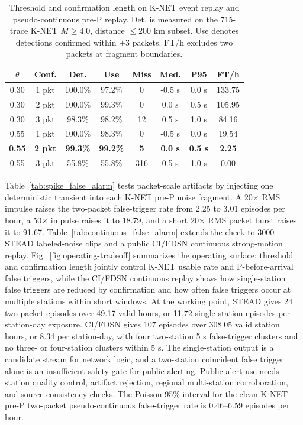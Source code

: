 \documentclass[journal]{IEEEtran}
\begin{document}
\begin{table}[!t]
\centering
\caption{Threshold and confirmation length on K-NET event replay and pseudo-continuous pre-P replay. Det. is measured on the 715-trace K-NET $M\geq4.0$, distance $\leq200$ km subset. Use denotes detections confirmed within $\pm$3 packets. FT/h excludes two packets at fragment boundaries.}
\label{tab:falsealarm}
{\scriptsize\setlength{\tabcolsep}{1.25pt}\renewcommand{\arraystretch}{1.03}
\begin{tabular}{@{}cccccccc@{}}
\toprule
$\theta$ & Conf. & Det. & Use & Miss & Med. & P95 & FT/h\\
\midrule
0.30 & 1 pkt & 100.0\% & 97.2\% & 0 & -0.5 s & 0.0 s & 133.75\\
0.30 & 2 pkt & 100.0\% & 99.3\% & 0 & 0.0 s & 0.5 s & 105.95\\
0.30 & 3 pkt & 98.3\% & 98.2\% & 12 & 0.5 s & 1.0 s & 84.16\\
0.55 & 1 pkt & 100.0\% & 98.3\% & 0 & -0.5 s & 0.0 s & 19.54\\
\textbf{0.55} & \textbf{2 pkt} & \textbf{99.3\%} & \textbf{99.2\%} & \textbf{5} & \textbf{0.0 s} & \textbf{0.5 s} & \textbf{2.25}\\
0.55 & 3 pkt & 55.8\% & 55.8\% & 316 & 0.5 s & 1.0 s & 0.00\\
\bottomrule
\end{tabular}}
\end{table}




Table~\ref{tab:spike_false_alarm} tests packet-scale artifacts by injecting one deterministic transient into each K-NET pre-P noise fragment. A 20$\times$ RMS impulse raises the two-packet false-trigger rate from 2.25 to 3.01 episodes per hour, a 50$\times$ impulse raises it to 18.79, and a short 20$\times$ RMS packet burst raises it to 91.67. Table~\ref{tab:continuous_false_alarm} extends the check to 3000 STEAD labeled-noise clips and a public CI/FDSN continuous strong-motion replay. Fig.~\ref{fig:operating-tradeoff} summarizes the operating surface: threshold and confirmation length jointly control K-NET usable rate and P-before-arrival false triggers, while the CI/FDSN continuous replay shows how single-station false triggers are reduced by confirmation and how often false triggers occur at multiple stations within short windows. At the working point, STEAD gives 24 two-packet episodes over 49.17 valid hours, or 11.72 single-station episodes per station-day exposure. CI/FDSN gives 107 episodes over 308.05 valid station hours, or 8.34 per station-day, with four two-station 5 s false-trigger clusters and no three- or four-station clusters within 5 s. The single-station output is a candidate stream for network logic, and a two-station coincident false trigger alone is an insufficient safety gate for public alerting. Public-alert use needs station quality control, artifact rejection, regional multi-station corroboration, and source-consistency checks. The Poisson 95\% interval for the clean K-NET pre-P two-packet pseudo-continuous false-trigger rate is 0.46--6.59 episodes per hour.
\end{document}
